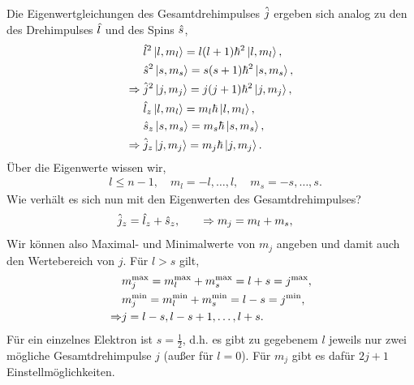 Die Eigenwertgleichungen des Gesamtdrehimpulses $\hat{\boldmath{j}}$ ergeben sich analog
zu den des Drehimpulses $\hat{\boldmath{l}}$ und des Spins $\hat{\boldmath{s}}$,
\begin{align*}
&\hat{\boldmath{l}}^2\left|l,m_l\right\rangle = l(l+1)\hbar^2\left|l,m_l\right\rangle,\\
&\hat{\boldmath{s}}^2\left|s,m_s\right\rangle = s(s+1)\hbar^2\left|s,m_s\right\rangle,\\
\Rightarrow\;&\hat{\boldmath{j}}^2\left|j,m_j\right\rangle = j(j+1)\hbar^2\left|j,m_j\right\rangle,\\
&\hat{\boldmath{l}}_z\left|l,m_l\right\rangle = m_l\hbar\left|l,m_l\right\rangle,\\
&\hat{\boldmath{s}}_z\left|s,m_s\right\rangle = m_s\hbar\left|s,m_s\right\rangle,\\
\Rightarrow\;&\hat{\boldmath{j}}_z\left|j,m_j\right\rangle = m_j\hbar\left|j,m_j\right\rangle.
\end{align*}
Über die Eigenwerte wissen wir,
\begin{align*}
&l\le n-1,\quad
m_l = -l,\ldots,l,\quad
m_s = -s,\ldots,s.
\end{align*}
Wie verhält es sich nun mit den Eigenwerten des Gesamtdrehimpulses?
\begin{align*}
&\hat{\boldmath{j}}_z = \hat{\boldmath{l}}_z + \hat{\boldmath{s}}_z,\qquad
\Rightarrow  m_j = m_l + m_s,
\end{align*}
Wir können also Maximal- und Minimalwerte von $m_j$ angeben und damit auch den
Wertebereich von $j$. Für $l>s$ gilt,
\begin{align*}
& m_j^{\small\text{max}} =
m_l^{\small\text{max}} + m_s^{\small\text{max}} = l+s = j^{\small\text{max}},\\
& m_j^{\small\text{min}} =
m_l^{\small\text{min}} + m_s^{\small\text{min}} = l-s = j^{\small\text{min}},\\
\Rightarrow & j = l-s,l-s+1,\ldots,l+s. 
\end{align*}
Für ein einzelnes Elektron ist $s=\frac{1}{2}$, d.h. es gibt zu gegebenem
$l$ jeweils nur zwei mögliche Gesamtdrehimpulse $j$ (außer für $l=0$). Für $m_j$
gibt es dafür $2j+1$ Einstellmöglichkeiten.
